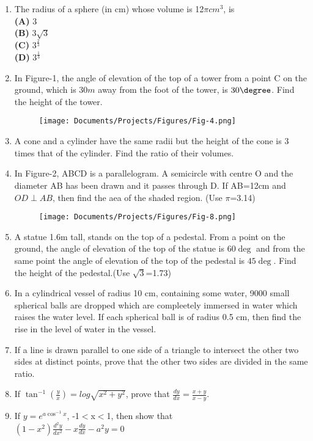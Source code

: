 \begin{enumerate}
\item The radius of a sphere (in cm) whose volume is 12$\pi cm^3$, is\\
\textbf{(A)} $3$\\
\textbf{(B)} $3 \sqrt{3}$\\
\textbf{(C)} $3^\frac{2}{3}$\\
\textbf{(D)} $3^\frac{1}{3}$\\
\item In Figure-1, the angle of elevation of the top of a tower from a point C on the ground, which is $30m$ away from the foot of the tower, is $30\degree$. Find the height of the tower.                                                                                                
	\begin{figure}[H]
		\centering                                                                         \texttt{[image: Documents/Projects/Figures/Fig-4.png]}                                                                                 	 \caption{}                                                                         \label{}
	\end{figure}
\item A cone and a cylinder have the same radii but the height of the cone is 3 times that of the cylinder. Find the ratio of their volumes.\\
\item In Figure-2, ABCD is a parallelogram. A semicircle with centre O and the diameter AB has been drawn and it passes through D. If AB=12cm and $OD \perp AB$, then find the aea of the shaded region. (Use $\pi$=3.14)\\
          \begin{figure}[H]
                  \centering
                  \texttt{[image: Documents/Projects/Figures/Fig-8.png]}
                 \caption{}
                 \label{}
          \end{figure}
\item A statue 1.6m tall, stands on the top of a pedestal. From a point on the ground, the angle of elevation of the top of the statue is $60\deg$ and from the same point the angle of elevation of the top of the pedestal is $45\deg$. Find the height of the pedestal.(Use $\sqrt{
    3}$=1.73)
\item In a cylindrical vessel of radius 10 cm, containing some water, 9000 small spherical balls are dropped which are compleetely immersed in water which raises the water level. If each spherical ball is of radius 0.5 cm, then find the rise in the level of water in the vessel.
\item If a line is drawn parallel to one side of a triangle to intersect the other two sides at distinct points, prove that the other two sides are divided in the same ratio.
\item If $\tan^{-1}\left(\frac{y}{x}\right)=log\sqrt{x^2+y^2}$, prove that $\frac{dy}{dx}=\frac{x+y}{x-y}$.
\item If $y=e^{a \cos^{-1}x}$, -1$<$x$<$1, then show that\\
         $(1-x^2)\frac{d^2y}{dx^2}-x\frac{dy}{dx}-a^2y=0$		
\end{enumerate}